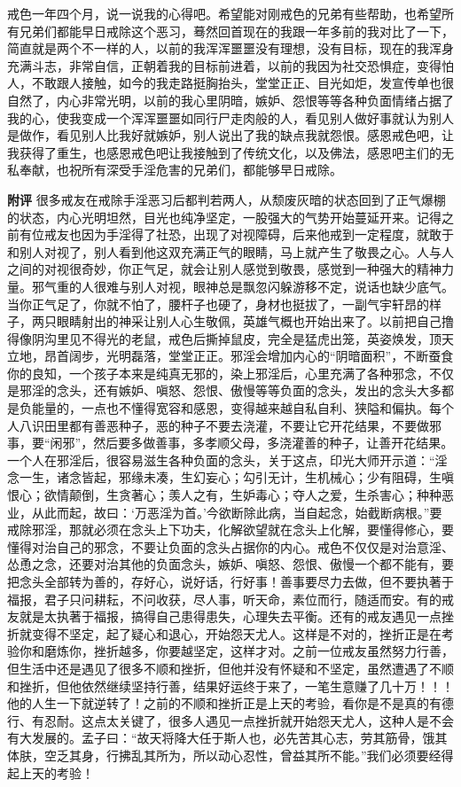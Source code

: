 \begin{case}
    戒色一年四个月，说一说我的心得吧。希望能对刚戒色的兄弟有些帮助，也希望所有兄弟们都能早日戒除这个恶习，蓦然回首现在的我跟一年多前的我对比了一下，简直就是两个不一样的人，以前的我浑浑噩噩没有理想，没有目标，现在的我浑身充满斗志，非常自信，正朝着我的目标前进着，以前的我因为社交恐惧症，变得怕人，不敢跟人接触，如今的我走路挺胸抬头，堂堂正正、目光如炬，发宣传单也很自然了，内心非常光明，以前的我心里阴暗，嫉妒、怨恨等等各种负面情绪占据了我的心，使我变成一个浑浑噩噩如同行尸走肉般的人，看见别人做好事就认为别人是做作，看见别人比我好就嫉妒，别人说出了我的缺点我就怨恨。感恩戒色吧，让我获得了重生，也感恩戒色吧让我接触到了传统文化，以及佛法，感恩吧主们的无私奉献，也祝所有深受手淫危害的兄弟们，都能够早日戒除。

    \textbf{附评} 很多戒友在戒除手淫恶习后都判若两人，从颓废灰暗的状态回到了正气爆棚的状态，内心光明坦然，目光也纯净坚定，一股强大的气势开始蔓延开来。记得之前有位戒友也因为手淫得了社恐，出现了对视障碍，后来他戒到一定程度，就敢于和别人对视了，别人看到他这双充满正气的眼睛，马上就产生了敬畏之心。人与人之间的对视很奇妙，你正气足，就会让别人感觉到敬畏，感觉到一种强大的精神力量。邪气重的人很难与别人对视，眼神总是飘忽闪躲游移不定，说话也缺少底气。当你正气足了，你就不怕了，腰杆子也硬了，身材也挺拔了，一副气宇轩昂的样子，两只眼睛射出的神采让别人心生敬佩，英雄气概也开始出来了。以前把自己撸得像阴沟里见不得光的老鼠，戒色后撕掉鼠皮，完全是猛虎出笼，英姿焕发，顶天立地，昂首阔步，光明磊落，堂堂正正。邪淫会增加内心的“阴暗面积”，不断蚕食你的良知，一个孩子本来是纯真无邪的，染上邪淫后，心里充满了各种邪念，不仅是邪淫的念头，还有嫉妒、嗔怒、怨恨、傲慢等等负面的念头，发出的念头大多都是负能量的，一点也不懂得宽容和感恩，变得越来越自私自利、狭隘和偏执。每个人八识田里都有善恶种子，恶的种子不要去浇灌，不要让它开花结果，不要做邪事，要“闲邪”，然后要多做善事，多孝顺父母，多浇灌善的种子，让善开花结果。一个人在邪淫后，很容易滋生各种负面的念头，关于这点，印光大师开示道：“淫念一生，诸念皆起，邪缘未凑，生幻妄心；勾引无计，生机械心；少有阻碍，生嗔恨心；欲情颠倒，生贪著心；羡人之有，生妒毒心；夺人之爱，生杀害心；种种恶业，从此而起，故曰：‘万恶淫为首。’今欲断除此病，当自起念，始截断病根。”要戒除邪淫，那就必须在念头上下功夫，化解欲望就在念头上化解，要懂得修心，要懂得对治自己的邪念，不要让负面的念头占据你的内心。戒色不仅仅是对治意淫、怂恿之念，还要对治其他的负面念头，嫉妒、嗔怒、怨恨、傲慢一个都不能有，要把念头全部转为善的，存好心，说好话，行好事！善事要尽力去做，但不要执著于福报，君子只问耕耘，不问收获，尽人事，听天命，素位而行，随适而安。有的戒友就是太执著于福报，搞得自己患得患失，心理失去平衡。还有的戒友遇见一点挫折就变得不坚定，起了疑心和退心，开始怨天尤人。这样是不对的，挫折正是在考验你和磨炼你，挫折越多，你要越坚定，这样才对。之前一位戒友虽然努力行善，但生活中还是遇见了很多不顺和挫折，但他并没有怀疑和不坚定，虽然遭遇了不顺和挫折，但他依然继续坚持行善，结果好运终于来了，一笔生意赚了几十万！！！他的人生一下就逆转了！之前的不顺和挫折正是上天的考验，看你是不是真的有德行、有忍耐。这点太关键了，很多人遇见一点挫折就开始怨天尤人，这种人是不会有大发展的。孟子曰：“故天将降大任于斯人也，必先苦其心志，劳其筋骨，饿其体肤，空乏其身，行拂乱其所为，所以动心忍性，曾益其所不能。”我们必须要经得起上天的考验！
\end{case}

